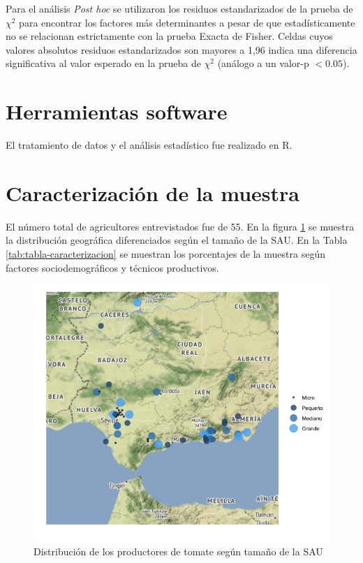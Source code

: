 \documentclass[a4paper, nobind]{templates/ociamthesis}
\begin{document}
Para el análisis \emph{Post hoc} se utilizaron los residuos estandarizados de la prueba de \({\chi}^2\) para encontrar los factores más determinantes a pesar de que estadísticamente no se relacionan estrictamente con la prueba Exacta de Fisher.
Celdas cuyos valores absolutos residuos estandarizados son mayores a 1,96 indica una diferencia significativa al valor esperado en la prueba de \({\chi}^2\) (análogo a un valor-p \(< 0.05\)).

\hypertarget{herramientas-software}{%
\section{Herramientas software}\label{herramientas-software}}

El tratamiento de datos y el análisis estadístico fue realizado en R.

\hypertarget{caracterizacion-demo}{%
\section{Caracterización de la muestra}\label{caracterizacion-demo}}

El número total de agricultores entrevistados fue de 55. En la figura \ref{fig:mapa-tomate} se muestra la distribución geográfica diferenciados según el tamaño de la SAU. En la Tabla \ref{tab:tabla-caracterizacion} se muestran los porcentajes de la muestra según factores sociodemográficos y técnicos productivos.

\begin{figure}[hbtp]

{\centering \includegraphics[width=0.9\linewidth]{figures/mapa-tomate} 

}

\caption[Mapa de entrevistados]{Distribución de los productores de tomate según tamaño de la SAU}\label{fig:mapa-tomate}
\end{figure}
\end{document}
